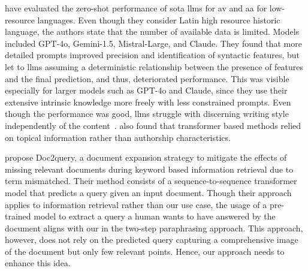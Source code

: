 \citet{schmidt_llm_av_latin_24} have evaluated the zero-shot performance of \acl{sota} \acp{llm} for \ac{av} and \ac{aa} for low-resource languages.
Even though they consider Latin high resource historic language, the authors state that the number of available data is limited.
Models included GPT-4o, Gemini-1.5, Mistral-Large, and Claude.
They found that more detailed prompts improved precision and identification of syntactic features, but let to \acp{llm} assuming a deterministic relationship between the presence of features and the final prediction, and thus, deteriorated performance.
This was visible especially for larger models such as GPT-4o and Claude, since they use their extensive intrinsic knowledge more freely with less constrained prompts.
Even though the performance was good, \acp{llm} struggle with discerning writing style independently of the content~\citep{schmidt_llm_av_latin_24}.
\citet{nguyen_bert_topic_av_2023} also found that transformer based methods relied on topical information rather than authorship characteristics.




\citet{nogueira_doc2query_2019} propose Doc2query, a document expansion strategy to mitigate the effects of missing relevant documents during keyword based information retrieval due to term mismatched.
Their method consists of a sequence-to-sequence transformer model that predicts a query given an input document.
Though their approach applies to information retrieval rather than our use case, the usage of a pre-trained model to extract a query a human wants to have answered by the document aligns with our \pextractor{} in the two-step paraphrasing approach.
This approach, however, does not rely on the predicted query capturing a comprehensive image of the document but only few relevant points.
Hence, our approach needs to enhance this idea.

